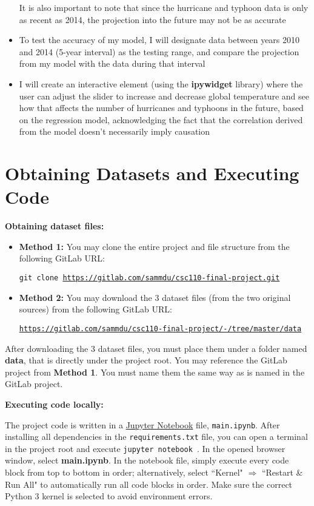 \documentclass[fontsize=11pt]{article}
\begin{document}
\begin{itemize}
    It is also important to note that since the hurricane and typhoon data is only as recent as 2014, the projection into the future may not be as accurate

    \item To test the accuracy of my model, I will designate data between years 2010 and 2014 (5-year interval) as the testing range, and compare the projection from my model with the data during that interval

    \item I will create an interactive element (using the \textbf{ipywidget} library) where the user can adjust the slider to increase and decrease global temperature and see how that affects the number of hurricanes and typhoons in the future, based on the regression model, acknowledging the fact that the correlation derived from the model doesn't necessarily imply causation
\end{itemize}

\section*{Obtaining Datasets and Executing Code}

\textbf{Obtaining dataset files:}

\begin{itemize}
    \item \textbf{Method 1:} You may clone the entire project and file structure from the following GitLab URL:

    \qquad \texttt{git clone \url{https://gitlab.com/sammdu/csc110-final-project.git}}

    \item \textbf{Method 2:} You may download the 3 dataset files (from the two original sources) from the following GitLab URL:

    \qquad \texttt{\url{https://gitlab.com/sammdu/csc110-final-project/-/tree/master/data}}
\end{itemize}

After downloading the 3 dataset files, you must place them under a folder named \textbf{data}, that is directly under the project root. You may reference the GitLab project from \textbf{Method 1}. You must name them the same way as is named in the GitLab project.

\bigskip

\noindent \textbf{Executing code locally:}

\medskip

The project code is written in a \href{https://jupyter.readthedocs.io/en/latest/running.html}{Jupyter Notebook} file, \texttt{main.ipynb}. After installing all dependencies in the \texttt{requirements.txt} file, you can open a terminal in the project root and execute \texttt{jupyter notebook
}. In the opened browser window, select \textbf{main.ipynb}. In the notebook file, simply execute every code block from top to bottom in order; alternatively, select ``Kernel" $\Rightarrow$ ``Restart \& Run All" to automatically run all code blocks in order. Make sure the correct Python 3 kernel is selected to avoid environment errors.
\end{document}
